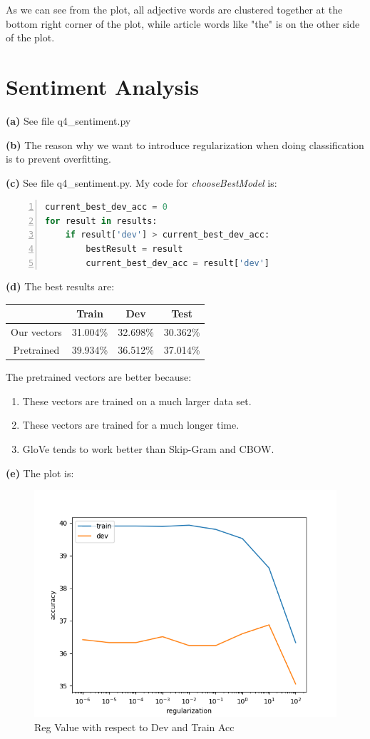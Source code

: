 \documentclass[10pt, a4paper]{ctexart}
\begin{document}
As we can see from the plot, all adjective words are clustered together at the bottom right corner of the plot, while article words like "the" is on the other side of the plot.\par

\section{Sentiment Analysis}
{\bf{(a)}} See file q4\_sentiment.py\par
{\bf{(b)}} The reason why we want to introduce regularization when doing classification is to prevent overfitting.\par
{\bf{(c)}} See file q4\_sentiment.py. My code for {\emph{chooseBestModel}} is:
\begin{lstlisting}[language=python,numbers=left,numberstyle=\tiny,frame=single]
current_best_dev_acc = 0
for result in results:
    if result['dev'] > current_best_dev_acc:
        bestResult = result
        current_best_dev_acc = result['dev']
\end{lstlisting}\par
{\bf{(d)}} The best results are:
\begin{table}[H]
    \centering
    \begin{tabular}{c|c|c|c}
        \hline
        \hline
        &Train&Dev&Test\\
        \hline
        Our vectors&31.004\%&32.698\%&30.362\%\\
        Pretrained&39.934\%&36.512\%&37.014\%\\
        \hline
    \end{tabular}
\end{table}\par
The pretrained vectors are better because:
\begin{enumerate}
    \item These vectors are trained on a much larger data set.
    \item These vectors are trained for a much longer time.
    \item GloVe tends to work better than Skip-Gram and CBOW.
\end{enumerate}\par
{\bf{(e)}} The plot is:
\begin{figure}[H]
    \centering
    \includegraphics[width=0.7\linewidth]{../q4_reg_v_acc.png}
    \caption{Reg Value with respect to Dev and Train Acc}
\end{figure}\par
\end{document}
